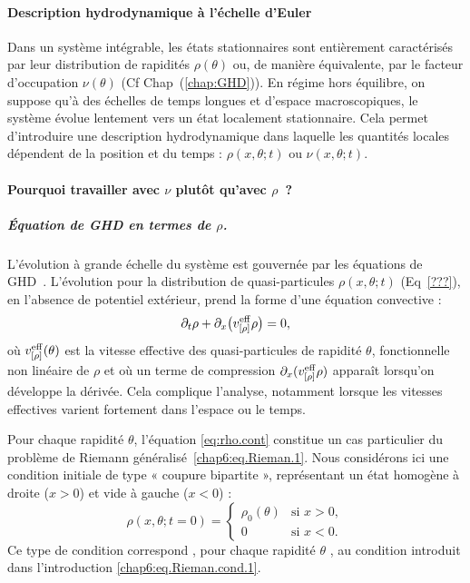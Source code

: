 \paragraph{Description hydrodynamique à l’échelle d’Euler}

Dans un système intégrable, les états stationnaires sont entièrement caractérisés par leur distribution de rapidités $\rho(\theta)$ ou, de manière équivalente, par le facteur d’occupation $\nu(\theta)$ (Cf {Chap~(\ref{chap:GHD})}). En régime hors équilibre, on suppose qu’à des échelles de temps longues et d’espace macroscopiques, le système évolue lentement vers un état localement stationnaire. Cela permet d’introduire une description hydrodynamique dans laquelle les quantités locales dépendent de la position et du temps : $\rho(x,\theta;t)$ ou $\nu(x,\theta;t)$.


\paragraph{Pourquoi travailler avec $\nu$ plutôt qu’avec $\rho$~?}
\subparagraph{Équation de GHD en termes de $\rho$.}
L’évolution à grande échelle du système est gouvernée par les équations de GHD~\cite{bertini_transport_2016, castro-alvaredo_emergent_2016}. 
L'évolution pour la distribution de quasi-particules $\rho(x,\theta;t)$ (Eq~\eqref{???}), en l'absence de potentiel extérieur, prend la forme d’une équation convective :
\begin{equation}
	\label{eq:rho.cont}
	\partial_t \rho + \partial_x \big( v^{\rm eff}_{[\rho]} \rho \big) = 0,
\end{equation}
où $v^{\rm eff}_{[\rho]}(\theta)$ est la vitesse effective des quasi-particules de rapidité $\theta$, fonctionnelle non linéaire de $\rho$ et où un terme de compression $\partial_x (v^{\rm eff}_{[\rho]} \rho)$ apparaît lorsqu’on développe la dérivée. Cela complique l’analyse, notamment lorsque les vitesses effectives varient fortement dans l’espace ou le temps.

Pour chaque rapidité $\theta$, l'équation \eqref{eq:rho.cont} constitue un cas particulier du problème de Riemann généralisé~\eqref{chap6:eq.Rieman.1}.
Nous considérons ici une condition initiale de type « coupure bipartite », représentant un état homogène à droite ($x>0$) et vide à gauche ($x<0$) :
\begin{equation}
    \label{eq:rho.cont.init}
    \rho(x,\theta;t=0) = 
    \begin{cases}
        \rho_0(\theta) & \text{si } x > 0, \\
        0 & \text{si } x < 0.
    \end{cases}
\end{equation}
Ce type de condition correspond , pour chaque rapidité $\theta$ , au condition introduit dans l'introduction \eqref{chap6:eq.Rieman.cond.1}.\\

